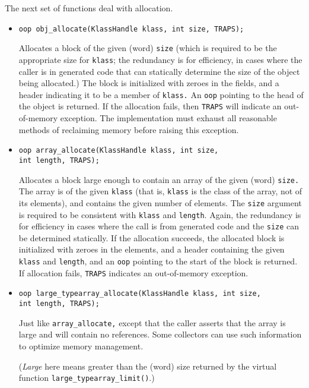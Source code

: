 \documentclass{article}
\begin{document}
The next set of functions deal with allocation.



\begin{itemize}
\item {\tt oop obj\_allocate(KlassHandle klass, int size, TRAPS);}

Allocates a block of the given (word) {\tt size} (which is required to
be the appropriate size for {\tt klass}; the redundancy is for efficiency, in
cases where the caller is in generated code that can statically
determine the size of the object being allocated.)  The block is
initialized with zeroes in the fields, and a header indicating it to
be a member of {\tt klass.}  An {\tt oop} pointing to the head of the
object is returned.  If the allocation fails, then {\tt TRAPS}
will indicate an out-of-memory exception.  The implementation must
exhaust all reasonable methods of reclaiming memory before raising
this exception.

\item {\tt oop array\_allocate(KlassHandle klass, int size,} \\
\hspace*{1.30in} {\tt int length, TRAPS);}

Allocates a block large enough to contain an array of the
given (word) {\tt size.}  The array is of the given {\tt klass} (that is,
{\tt klass} is the class of the array, not of its elements), and
contains the given number of elements.  The {\tt size} argument is
required to be consistent with {\tt klass} and {\tt length}.  Again,
the redundancy is for efficiency in cases where the call is from
generated code and the {\tt size} can be determined statically.  If
the allocation succeeds, the allocated block is initialized with
zeroes in the elements, and a header containing the given {\tt klass}
and {\tt length}, and an {\tt oop} pointing to the start of the block
is returned.  If allocation fails, {\tt TRAPS} indicates an
out-of-memory exception.

\item {\tt oop large\_typearray\_allocate(KlassHandle klass, int size,}\\
\hspace*{2.02in} {\tt int length, TRAPS);}

Just like {\tt array\_allocate,} except that the caller asserts that
the array is large and will contain no references.  Some collectors
can use such information to optimize memory management.

({\em Large} here means greater than the (word) size returned by the
virtual function {\tt large\_typearray\_limit()}.)

\end{itemize}
\end{document}

